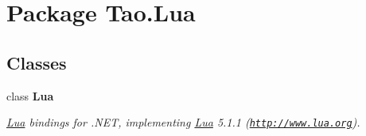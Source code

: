 \hypertarget{namespace_tao_1_1_lua}{
\section{Package Tao.Lua}
\label{namespace_tao_1_1_lua}
}
\subsection*{Classes}
\begin{DoxyCompactItemize}
\item 
class {\bfseries Lua}
\begin{DoxyCompactList}\small\item\em \hyperlink{namespace_tao_1_1_lua}{Lua} bindings for .NET, implementing \hyperlink{namespace_tao_1_1_lua}{Lua} 5.1.1 (\href{http://www.lua.org}{\tt http://www.lua.org}). \item\end{DoxyCompactList}\end{DoxyCompactItemize}
